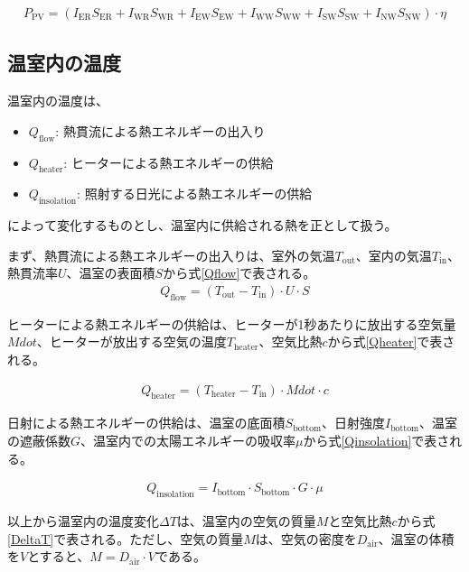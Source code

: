 \documentclass[uplatex,dvipdfmx,nomag,a4paper,oneside,onecolumn,12pt]{bxjsreport} %
\begin{document}
\begin{align}
    P_{\text{PV}} =  (I_{\text{ER}} S_{\text{ER}} + I_{\text{WR}} S_{\text{WR}} + I_{\text{EW}} S_{\text{EW}} + I_{\text{WW}} S_{\text{WW}} + I_{\text{SW}} S_{\text{SW}} + I_{\text{NW}} S_{\text{NW}}) \cdot \eta
    \label{Ppv}
\end{align}


\subsection{温室内の温度}
温室内の温度は、
\begin{itemize}
    \item \(Q_\text{flow}\): 熱貫流による熱エネルギーの出入り
    \item \(Q_\text{heater}\): ヒーターによる熱エネルギーの供給
    \item \(Q_\text{insolation}\): 照射する日光による熱エネルギーの供給
\end{itemize}
によって変化するものとし、温室内に供給される熱を正として扱う。

まず、熱貫流による熱エネルギーの出入りは、室外の気温\(T_\text{out}\)、室内の気温\(T_\text{in}\)、熱貫流率\(U\)、温室の表面積\(S\)から式\eqref{Qflow}で表される。
\begin{align}
    Q_\text{flow} = (T_\text{out} - T_\text{in}) \cdot U \cdot S
    \label{Qflow}
\end{align}

ヒーターによる熱エネルギーの供給は、ヒーターが1秒あたりに放出する空気量\(Mdot\)、ヒーターが放出する空気の温度\(T_\text{heater}\)、空気比熱\(c\)から式\eqref{Qheater}で表される。

\begin{align}
    Q_\text{heater} = (T_\text{heater} - T_\text{in}) \cdot Mdot \cdot c
    \label{Qheater}
\end{align}

日射による熱エネルギーの供給は、温室の底面積\(S_\text{bottom}\)、日射強度\(I_\text{bottom}\)、温室の遮蔽係数\(G\)、温室内での太陽エネルギーの吸収率\(\mu\)から式\eqref{Qinsolation}で表される。

\begin{align}
    Q_\text{insolation} = I_\text{bottom} \cdot S_\text{bottom} \cdot G \cdot \mu
    \label{Qinsolation}
\end{align}

以上から温室内の温度変化\(\Delta T\)は、温室内の空気の質量\(M\)と空気比熱\(c\)から式\eqref{DeltaT}で表される。ただし、空気の質量\(M\)は、空気の密度を\(D_\text{air}\)、温室の体積を\(V\)とすると、\(M = D_\text{air} \cdot V\)である。
\end{document}
